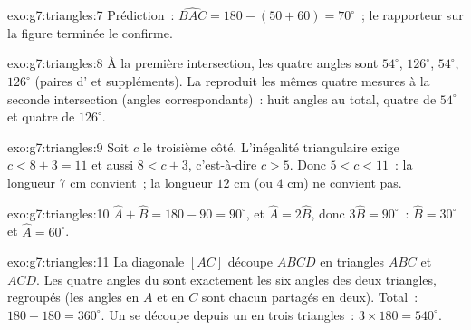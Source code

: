 \begin{solution}{exo:g7:triangles:7}
Prédiction~: $\widehat{BAC} = 180 - (50 + 60) = 70^\circ$~; le
rapporteur sur la figure terminée le confirme.
\end{solution}

\begin{solution}{exo:g7:triangles:8}
À la première intersection, les quatre angles sont $54^\circ$,
$126^\circ$, $54^\circ$, $126^\circ$ (paires d' et
suppléments). La  reproduit les mêmes quatre mesures à la
seconde intersection (angles correspondants)~: huit angles au total,
quatre de $54^\circ$ et quatre de $126^\circ$.
\end{solution}

\begin{solution}{exo:g7:triangles:9}
Soit $c$ le troisième côté. L'inégalité triangulaire exige
$c < 8 + 3 = 11$ et aussi $8 < c + 3$, c'est-à-dire $c > 5$. Donc
$5 < c < 11$~: la longueur $7$ cm convient~; la longueur $12$ cm (ou
$4$ cm) ne convient pas.
\end{solution}

\begin{solution}{exo:g7:triangles:10}
$\widehat A + \widehat B = 180 - 90 = 90^\circ$, et
$\widehat A = 2\widehat B$, donc $3\widehat B = 90^\circ$~:
$\widehat B = 30^\circ$ et $\widehat A = 60^\circ$.
\end{solution}

\begin{solution}{exo:g7:triangles:11}
La diagonale $[AC]$ découpe $ABCD$ en triangles $ABC$ et $ACD$. Les
quatre angles du  sont exactement les six angles des deux
triangles, regroupés (les angles en $A$ et en $C$ sont chacun
partagés en deux). Total~: $180 + 180 = 360^\circ$. Un  se
découpe depuis un  en trois triangles~: $3 \times 180 =
540^\circ$.
\end{solution}

